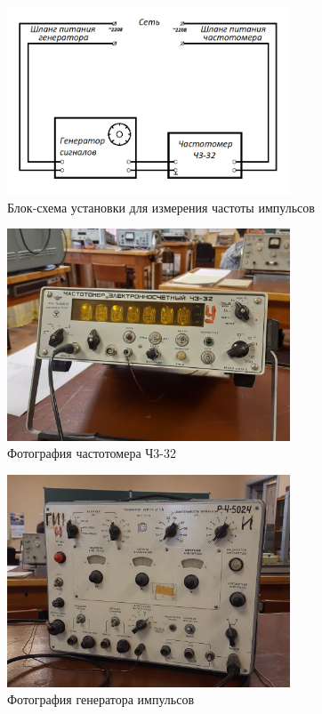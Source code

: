 \begin{figure}[ht!]
\centering
\includegraphics[width=0.75\textwidth]{Scheme.png}
\caption{Блок-схема установки для измерения частоты импульсов}
\label{fig:Scheme}
\end{figure}

\begin{figure}[ht!]
\centering
\includegraphics[width=0.75\textwidth]{photo1.jpg}
\caption{Фотография частотомера Ч3-32}
\label{fig:photo1}
\end{figure}

\begin{figure}[ht!]
\centering
\includegraphics[width=0.75\textwidth]{photo2.jpg}
\caption{Фотография генератора импульсов}
\label{fig:photo2}
\end{figure}

